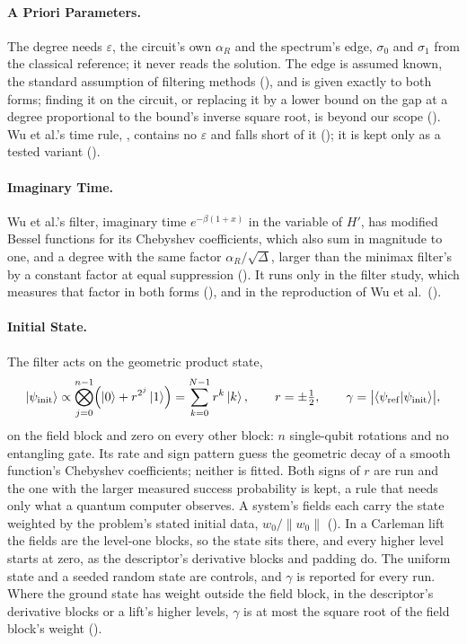 \paragraph{A Priori Parameters.} The degree needs $\varepsilon$, the circuit's own $\alpha_R$ and the spectrum's edge, $\sigma_0$ and $\sigma_1$ from the classical reference; it never reads the solution. The edge is assumed known, the standard assumption of filtering methods (), and is given exactly to both forms; finding it on the circuit, or replacing it by a lower bound on the gap at a degree proportional to the bound's inverse square root, is beyond our scope (). Wu et al.'s time rule, , contains no $\varepsilon$ and falls short of it (); it is kept only as a tested variant ().

\paragraph{Imaginary Time.} Wu et al.'s filter, imaginary time $e^{-\beta(1+x)}$ in the variable of $H'$, has modified Bessel functions for its Chebyshev coefficients, which also sum in magnitude to one, and a degree with the same factor $\alpha_R/\sqrt\Delta$, larger than the minimax filter's by a constant factor at equal suppression (). It runs only in the filter study, which measures that factor in both forms (), and in the reproduction of Wu et al.\ ().

\paragraph{Initial State.} The filter acts on the geometric product state,
\begin{equation}
    \ket{\psi_{\mathrm{init}}}\propto\bigotimes_{j=0}^{n-1}\Bigl(\ket{0}+r^{2^j}\ket{1}\Bigr)=\sum_{k=0}^{N-1}r^k\ket{k},
    \qquad
    r=\pm\tfrac12,
    \qquad
    \gamma=\bigl|\braket{\psi_{\mathrm{ref}}|\psi_{\mathrm{init}}}\bigr| ,
    \label{eq:geometric-state}
\end{equation}
on the field block and zero on every other block: $n$ single-qubit rotations and no entangling gate. Its rate and sign pattern guess the geometric decay of a smooth function's Chebyshev coefficients; neither is fitted. Both signs of $r$ are run and the one with the larger measured success probability is kept, a rule that needs only what a quantum computer observes. A system's fields each carry the state weighted by the problem's stated initial data, $w_0/\|w_0\|$ (). In a Carleman lift the fields are the level-one blocks, so the state sits there, and every higher level starts at zero, as the descriptor's derivative blocks and padding do. The uniform state and a seeded random state are controls, and $\gamma$ is reported for every run. Where the ground state has weight outside the field block, in the descriptor's derivative blocks or a lift's higher levels, $\gamma$ is at most the square root of the field block's weight ().

